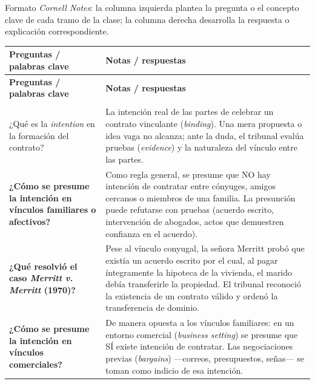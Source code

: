 \documentclass[12pt,oneside]{book}
\begin{document}
Formato \textit{Cornell Notes}: la columna izquierda plantea la pregunta o el concepto clave de cada tramo de la clase; la columna derecha desarrolla la respuesta o explicación correspondiente.

\begin{longtable}{
    >{\raggedright\arraybackslash\bfseries}p{}
    >{\raggedright\arraybackslash}p{}
}
\toprule
\textbf{Preguntas / palabras clave} & \textbf{Notas / respuestas} \\
\midrule
\endfirsthead

\toprule
\textbf{Preguntas / palabras clave} & \textbf{Notas / respuestas} \\
\midrule
\endhead

\midrule
\multicolumn{2}{r}{\textit{Continúa en la página siguiente}} \\
\endfoot

\bottomrule
\endlastfoot

¿Qué es la \textit{intention} en la formación del contrato? &
La intención real de las partes de celebrar un contrato vinculante (\textit{binding}). Una mera propuesta o idea vaga no alcanza; ante la duda, el tribunal evalúa pruebas (\textit{evidence}) y la naturaleza del vínculo entre las partes. \\

¿Cómo se presume la intención en vínculos familiares o afectivos? &
Como regla general, se presume que NO hay intención de contratar entre cónyuges, amigos cercanos o miembros de una familia. La presunción puede refutarse con pruebas (acuerdo escrito, intervención de abogados, actos que demuestren confianza en el acuerdo). \\

¿Qué resolvió el caso \textit{Merritt v. Merritt} (1970)? &
Pese al vínculo conyugal, la señora Merritt probó que existía un acuerdo escrito por el cual, al pagar íntegramente la hipoteca de la vivienda, el marido debía transferirle la propiedad. El tribunal reconoció la existencia de un contrato válido y ordenó la transferencia de dominio. \\

¿Cómo se presume la intención en vínculos comerciales? &
De manera opuesta a los vínculos familiares: en un entorno comercial (\textit{business setting}) se presume que SÍ existe intención de contratar. Las negociaciones previas (\textit{bargains}) —correos, presupuestos, señas— se toman como indicio de esa intención. \\


\end{longtable}
\end{document}
